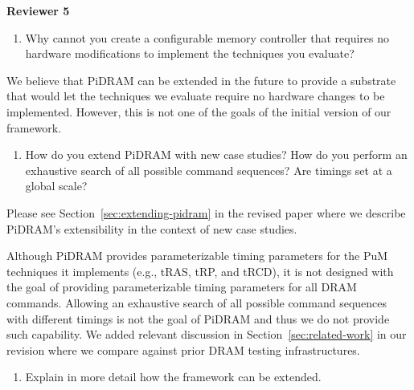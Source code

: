 \newpage

\noindent \textbf{\large{Reviewer 5}}

\bigbreak
\begin{tcolorbox}
    \begin{enumerate}[label=R5/\arabic*]
        \item \label{q:r5q1} Why cannot you create a configurable memory controller that requires no hardware modifications to implement the techniques you evaluate?
    \end{enumerate}
\end{tcolorbox} 

We believe that PiDRAM can be extended in the future to provide a substrate that would let the techniques we evaluate require no hardware changes to be implemented. However, this is not one of the goals of the initial version of our framework.

\bigbreak
\begin{tcolorbox}
    \begin{enumerate}[label=R5/\arabic*]
        \addtocounter{enumi}{1}
        \item \label{q:r5q2} How do you extend PiDRAM with new case studies? How do you perform an exhaustive search of all possible command sequences? Are timings set at a global scale?  
    \end{enumerate}
\end{tcolorbox} 

Please see Section~\ref{sec:extending-pidram} in the revised paper where we describe PiDRAM’s extensibility in the context of new case studies.

Although PiDRAM provides parameterizable timing parameters for the PuM techniques it implements (e.g., tRAS, tRP, and tRCD), it is not designed with the goal of providing parameterizable timing parameters for all DRAM commands. Allowing an exhaustive search of all possible command sequences with different timings is not the goal of PiDRAM and thus we do not provide such capability. We added relevant discussion in Section~\ref{sec:related-work} in our revision where we compare against prior DRAM testing infrastructures.

\bigbreak
\begin{tcolorbox}
    \begin{enumerate}[label=R5/\arabic*]
        \addtocounter{enumi}{2}
        \item \label{q:r5q3} Explain in more detail how the framework can be extended.
    \end{enumerate}
\end{tcolorbox} 

